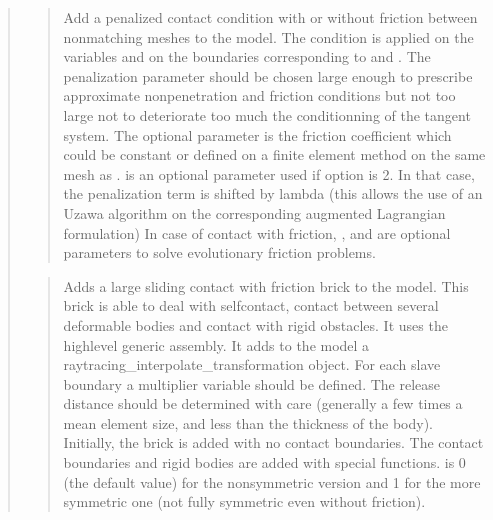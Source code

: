 \documentclass[a4paper,11pt,english]{sphinxmanual}
\begin{document}
\begin{quote}
\begin{quote}

Add a penalized contact condition with or without friction between
nonmatching meshes to the model.
The condition is applied on the variables  and  
on the boundaries corresponding to  and .
The penalization parameter  should be chosen
large enough to prescribe approximate non\sphinxhyphen{}penetration and friction
conditions but not too large not to deteriorate too much the
conditionning of the tangent system.
The optional parameter  is the friction
coefficient which could be constant or defined on a finite element
method on the same mesh as .
 is an optional parameter used if option
is 2. In that case, the penalization term is shifted by lambda (this
allows the use of an Uzawa algorithm on the corresponding augmented
Lagrangian formulation)
In case of contact with friction, ,  and
 are optional parameters to solve evolutionary friction
problems.
\end{quote}

\begin{quote}

Adds a large sliding contact with friction brick to the model.
This brick is able to deal with self\sphinxhyphen{}contact, contact between
several deformable bodies and contact with rigid obstacles.
It uses the high\sphinxhyphen{}level generic assembly. It adds to the model
a raytracing\_interpolate\_transformation object.
For each slave boundary a multiplier variable should be defined.
The release distance should be determined with care
(generally a few times a mean element size, and less than the
thickness of the body). Initially, the brick is added with no contact
boundaries. The contact boundaries and rigid bodies are added with
special functions.  is 0 (the default value) for the
non\sphinxhyphen{}symmetric version and 1 for the more symmetric one
(not fully symmetric even without friction).
\end{quote}


\end{quote}
\end{document}
